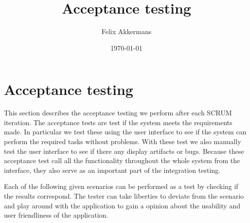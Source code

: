 \documentclass{article}
\begin{document}
\title{Acceptance testing}
\author{Felix Akkermans}
\date{\today}
\maketitle



\section{Acceptance testing}
This section describes the acceptance testing we perform after each SCRUM iteration. The acceptance tests are test if the system meets the requirements made. In particular we test these using the user interface to see if the system can perform the required tasks without problems. With these test we also manually test the user interface to see if there any display artifacts or bugs. Because these acceptance test call all the functionality throughout the whole system from the interface, they also serve as an important part of the integration testing.

Each of the following given scenarios can be performed as a test by checking if the results correspond. The tester can take liberties to deviate from the scenario and play around with the application to gain a opinion about the usability and user friendliness of the application.
\end{document}
